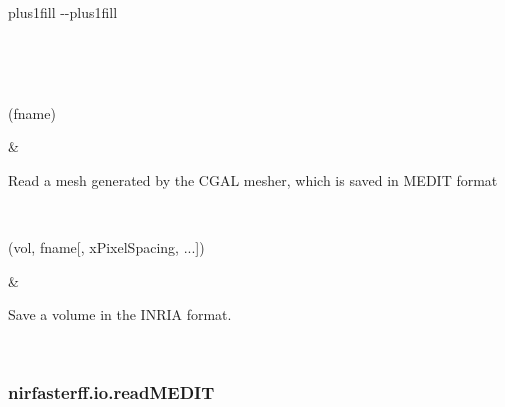 \documentclass[letterpaper,10pt,english]{sphinxmanual}
\begin{document}
\begin{savenotes}
\sphinxatlongtablestart
\sphinxthistablewithglobalstyle
\sphinxthistablewithnovlinesstyle
\makeatletter
  \LTleft \@totalleftmargin plus1fill
  \LTright\dimexpr\columnwidth-\@totalleftmargin-\linewidth\relax plus1fill
\makeatother
\begin{longtable}{}
\sphinxtoprule
\endfirsthead

\\
\sphinxtoprule
\endhead

\sphinxbottomrule
{}\\
\endfoot

\endlastfoot
\sphinxtableatstartofbodyhook
\begin{varwidth}[t]{}
\sphinxAtStartPar
{\hyperref[\detokenize{_autosummary/nirfasterff.io.readMEDIT:nirfasterff.io.readMEDIT}]{}}(fname)
\sphinxbeforeendvarwidth
\end{varwidth}%
&\begin{varwidth}[t]{}
\sphinxAtStartPar
Read a mesh generated by the CGAL mesher, which is saved in MEDIT format
\sphinxbeforeendvarwidth
\end{varwidth}%
\\
\sphinxhline\begin{varwidth}[t]{}
\sphinxAtStartPar
{\hyperref[\detokenize{_autosummary/nirfasterff.io.saveinr:nirfasterff.io.saveinr}]{}}(vol, fname{[}, xPixelSpacing, ...{]})
\sphinxbeforeendvarwidth
\end{varwidth}%
&\begin{varwidth}[t]{}
\sphinxAtStartPar
Save a volume in the INRIA format.
\sphinxbeforeendvarwidth
\end{varwidth}%
\\
\sphinxbottomrule
\end{longtable}
\sphinxtableafterendhook
\sphinxatlongtableend
\end{savenotes}

\sphinxstepscope


\subsubsection{nirfasterff.io.readMEDIT}
\label{\detokenize{_autosummary/nirfasterff.io.readMEDIT:nirfasterff-io-readmedit}}\label{\detokenize{_autosummary/nirfasterff.io.readMEDIT::doc}}
\end{document}
